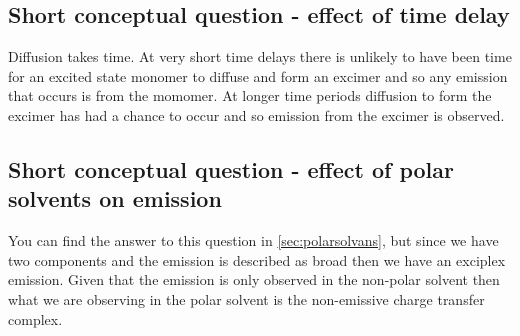 \documentclass[
]{book}
\begin{document}
\hypertarget{short-conceptual-question---effect-of-time-delay-2}{%
\subsection{Short conceptual question - effect of time delay}\label{short-conceptual-question---effect-of-time-delay-2}}

Diffusion takes time. At very short time delays there is unlikely to have been time for an excited state monomer to diffuse and form an excimer and so any emission that occurs is from the momomer. At longer time periods diffusion to form the excimer has had a chance to occur and so emission from the excimer is observed.

\hypertarget{sec:polarsolv}{%
\subsection{Short conceptual question - effect of polar solvents on emission}\label{sec:polarsolv}}

You can find the answer to this question in \ref{sec:polarsolvans}, but since we have two components and the emission is described as broad then we have an exciplex emission. Given that the emission is only observed in the non-polar solvent then what we are observing in the polar solvent is the non-emissive charge transfer complex.

  
\end{document}
